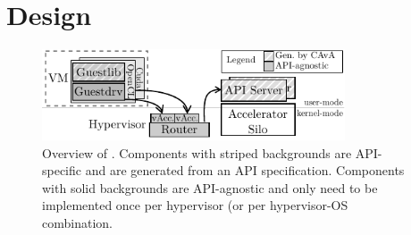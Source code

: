 \section{Design}
\label{s:design}

\begin{figure}[t!]
	\centering
	\includegraphics[width=0.8\textwidth]{ava/images/design_high_level.pdf}
	\caption{Overview of \hirafull. Components with striped backgrounds are API-specific and are generated from an API specification. Components with solid backgrounds are API-agnostic and only need to be implemented once per hypervisor (or per hypervisor-OS combination.}
	\label{fig:design}
\end{figure}

